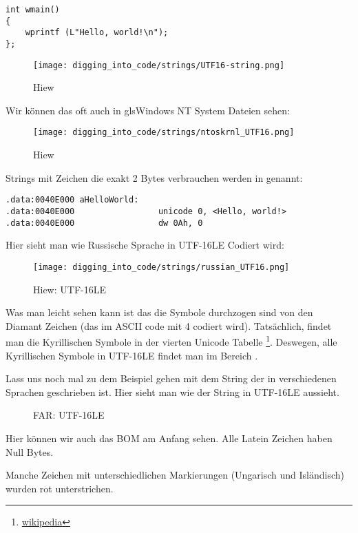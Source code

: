 \begin{lstlisting}[style=customc]
int wmain()
{
	wprintf (L"Hello, world!\n");
};
\end{lstlisting}

\begin{figure}[H]
\centering
\texttt{[image: digging\_into\_code/strings/UTF16-string.png]}
\caption{Hiew}
\end{figure}

Wir können das oft auch in gls{Windows NT} System Dateien sehen:

\begin{figure}[H]
\centering
\texttt{[image: digging\_into\_code/strings/ntoskrnl\_UTF16.png]}
\caption{Hiew}
\end{figure}

Strings mit Zeichen die exakt 2 Bytes verbrauchen werden  in \IDA genannt:

\begin{lstlisting}[style=customasmx86]
.data:0040E000 aHelloWorld:
.data:0040E000                 unicode 0, <Hello, world!>
.data:0040E000                 dw 0Ah, 0
\end{lstlisting}

Hier sieht man wie Russische Sprache in UTF-16LE Codiert wird:

\begin{figure}[H]
\centering
\texttt{[image: digging\_into\_code/strings/russian\_UTF16.png]}
\caption{Hiew: UTF-16LE}
\end{figure}

Was man leicht sehen kann ist das die Symbole durchzogen sind von den Diamant Zeichen (das im ASCII code mit 4 codiert wird).
Tatsächlich, findet man die Kyrillischen Symbole in der vierten Unicode Tabelle 
\footnote{\href{http://go.yurichev.com/17003}{wikipedia}}.
Deswegen, alle Kyrillischen Symbole in UTF-16LE findet man im Bereich .

Lass uns noch mal zu dem Beispiel gehen mit dem String der in verschiedenen Sprachen geschrieben ist.
Hier sieht man wie der String in UTF-16LE aussieht. 

\begin{figure}[H]
\centering
{}
\caption{FAR: UTF-16LE}
\end{figure}

Hier können wir auch das \ac{BOM} am Anfang sehen. 
Alle Latein Zeichen haben Null Bytes. %

Manche Zeichen mit unterschiedlichen Markierungen (Ungarisch und Isländisch) wurden rot unterstrichen.



